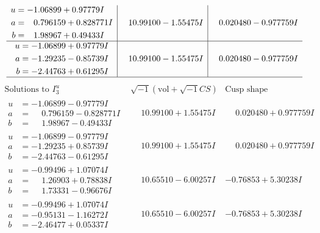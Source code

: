 \documentclass[1p]{elsarticle_modified}
\theoremstyle{definition}
\newcommand{\I}{\sqrt{-1}}
\begin{document}
$$\begin{array}{c|c|c}
\begin{aligned}
u &= -1.06899 + 0.97779 I \\
a &= \phantom{-}0.796159 + 0.828771 I \\
b &= \phantom{-}1.98967 + 0.49433 I\end{aligned}
 & \phantom{-}10.99100 - 1.55475 I & \phantom{-}0.020480 - 0.977759 I \\ \hline\begin{aligned}
u &= -1.06899 + 0.97779 I \\
a &= -1.29235 - 0.85739 I \\
b &= -2.44763 + 0.61295 I\end{aligned}
 & \phantom{-}10.99100 - 1.55475 I & \phantom{-}0.020480 - 0.977759 I\\
 \hline 
 \end{array}$$\newpage$$\begin{array}{c|c|c}  
\text{Solutions to }I^u_{3}& \I (\text{vol} + \sqrt{-1}CS) & \text{Cusp shape}\\
 \hline 
\begin{aligned}
u &= -1.06899 - 0.97779 I \\
a &= \phantom{-}0.796159 - 0.828771 I \\
b &= \phantom{-}1.98967 - 0.49433 I\end{aligned}
 & \phantom{-}10.99100 + 1.55475 I & \phantom{-}0.020480 + 0.977759 I \\ \hline\begin{aligned}
u &= -1.06899 - 0.97779 I \\
a &= -1.29235 + 0.85739 I \\
b &= -2.44763 - 0.61295 I\end{aligned}
 & \phantom{-}10.99100 + 1.55475 I & \phantom{-}0.020480 + 0.977759 I \\ \hline\begin{aligned}
u &= -0.99496 + 1.07074 I \\
a &= \phantom{-}1.26903 + 0.78838 I \\
b &= \phantom{-}1.73331 - 0.96676 I\end{aligned}
 & \phantom{-}10.65510 - 6.00257 I & -0.76853 + 5.30238 I \\ \hline\begin{aligned}
u &= -0.99496 + 1.07074 I \\
a &= -0.95131 - 1.16272 I \\
b &= -2.46477 + 0.05337 I\end{aligned}
 & \phantom{-}10.65510 - 6.00257 I & -0.76853 + 5.30238 I \\ \hline\begin{aligned}

\end{aligned}
\end{array}$$
\end{document}
